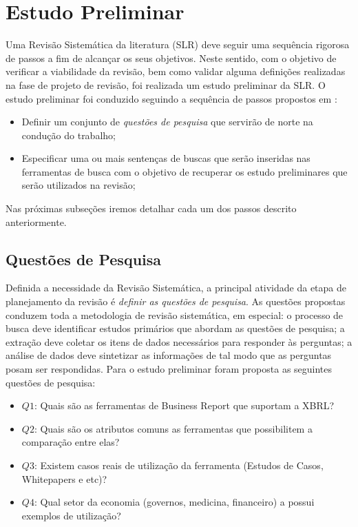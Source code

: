 \documentclass{article}
\begin{document}
\section{Estudo Preliminar}
\label{sec:rsl}

Uma Revisão Sistemática da literatura (SLR) deve seguir uma sequência rigorosa de passos a fim de
alcançar os seus objetivos. Neste sentido, com o objetivo de verificar a
viabilidade da revisão, bem como validar alguma definições realizadas
na fase de projeto de revisão, foi realizada um estudo preliminar da
SLR. O estudo preliminar foi conduzido seguindo a sequência de passos
propostos em \cite{keele2007guidelines}: 
\begin{itemize}
    \item Definir um conjunto de \textit{questões de pesquisa} que servirão de norte na condução do trabalho;
  \item Especificar uma ou mais sentenças de buscas que serão
    inseridas nas ferramentas de busca com o objetivo de recuperar os
    estudo preliminares que serão utilizados na revisão;
\end{itemize}

Nas próximas subseções iremos detalhar cada um dos passos descrito
anteriormente.

\subsection{Questões de Pesquisa}
\label{subsec:research_question}

Definida a necessidade da Revisão Sistemática, a principal atividade
da etapa de planejamento da revisão é \textit{definir as questões de
  pesquisa}. As questões propostas conduzem toda a metodologia
de revisão sistemática, em especial: o processo de busca deve identificar estudos
primários que abordam as questões de pesquisa; a extração
deve coletar os itens de dados necessários para responder às
perguntas; a análise de dados deve sintetizar as
informações de tal modo que as perguntas posam ser respondidas. Para o
estudo preliminar foram proposta as seguintes questões de pesquisa:
\begin{itemize}
  \item \textbf{$Q1$}: Quais são as ferramentas de Business Report que
    suportam a XBRL?
  \item \textbf{$Q2$}: Quais são os atributos comuns as ferramentas
    que possibilitem a comparação entre elas?
  \item \textbf{$Q3$}: Existem casos reais de utilização da ferramenta
    (Estudos de Casos, Whitepapers e etc)?
  \item \textbf{$Q4$}: Qual setor da economia (governos, medicina, financeiro) a
    possui exemplos de utilização?
\end{itemize}
\end{document}

